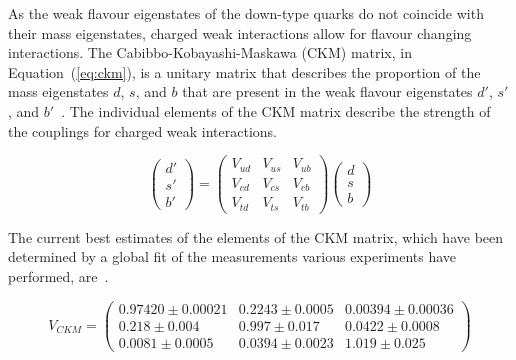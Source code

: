 

As the weak flavour eigenstates of the down-type quarks do not coincide with their mass eigenstates, charged weak interactions allow for flavour changing interactions.
The Cabibbo-Kobayashi-Maskawa (CKM) matrix, in Equation~(\ref{eq:ckm}), is a unitary matrix that describes the proportion of the mass eigenstates $d$, $s$, and $b$ that are present in the weak flavour eigenstates $d'$, $s'$, and $b'$~\cite{Tanabashi:2018oca}.
The individual elements of the CKM matrix describe the strength of the couplings for charged weak interactions.

\begin{equation}
\begin{pmatrix} 
d' \\
s' \\
b'
\end{pmatrix}
=
\begin{pmatrix} 
V_{ud} & V_{us} & V_{ub} \\
V_{cd} & V_{cs} & V_{cb} \\
V_{td} & V_{ts} & V_{tb}
\end{pmatrix}
\begin{pmatrix} 
d \\
s \\
b
\end{pmatrix}
\label{eq:ckm}
\end{equation}

The current best estimates of the elements of the CKM matrix, which have been determined by a global fit of the measurements various experiments have performed, are~\cite{Tanabashi:2018oca}.

\begin{equation}
V_{CKM} = 
\begin{pmatrix} 
0.97420 \pm 0.00021 & 0.2243 \pm 0.0005 & 0.00394 \pm 0.00036 \\
0.218 \pm 0.004 &  0.997 \pm 0.017 & 0.0422 \pm 0.0008 \\
0.0081 \pm 0.0005 & 0.0394 \pm 0.0023 & 1.019 \pm 0.025
\end{pmatrix}
\label{eq:ckmElements}
\end{equation}

